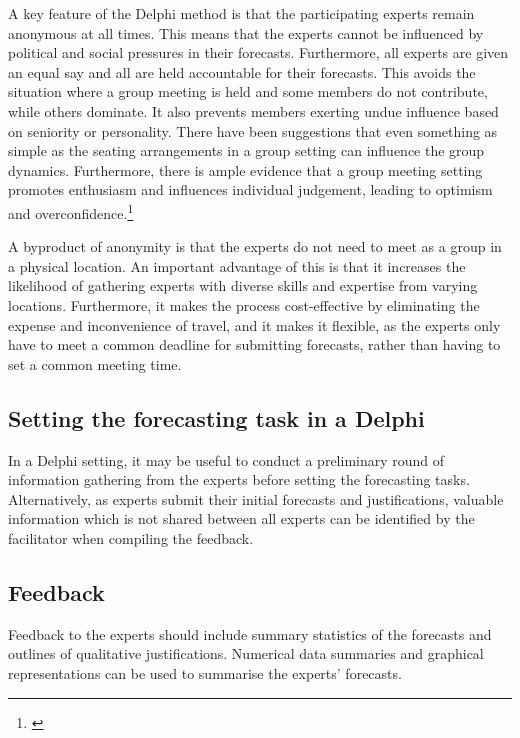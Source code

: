 \documentclass[]{book}
\let\rmarkdownfootnote\footnote%
\def\footnote{\protect\rmarkdownfootnote}
\begin{document}
A key feature of the Delphi method is that the participating experts remain anonymous at all times. This means that the experts cannot be influenced by political and social pressures in their forecasts. Furthermore, all experts are given an equal say and all are held accountable for their forecasts. This avoids the situation where a group meeting is held and some members do not contribute, while others dominate. It also prevents members exerting undue influence based on seniority or personality. There have been suggestions that even something as simple as the seating arrangements in a group setting can influence the group dynamics. Furthermore, there is ample evidence that a group meeting setting promotes enthusiasm and influences individual judgement, leading to optimism and overconfidence.\footnote{\citet{Buehler2005}}

A byproduct of anonymity is that the experts do not need to meet as a group in a physical location. An important advantage of this is that it increases the likelihood of gathering experts with diverse skills and expertise from varying locations. Furthermore, it makes the process cost-effective by eliminating the expense and inconvenience of travel, and it makes it flexible, as the experts only have to meet a common deadline for submitting forecasts, rather than having to set a common meeting time.

\hypertarget{setting-the-forecasting-task-in-a-delphi}{%
\subsection*{Setting the forecasting task in a Delphi}\label{setting-the-forecasting-task-in-a-delphi}}

In a Delphi setting, it may be useful to conduct a preliminary round of information gathering from the experts before setting the forecasting tasks. Alternatively, as experts submit their initial forecasts and justifications, valuable information which is not shared between all experts can be identified by the facilitator when compiling the feedback.

\hypertarget{feedback}{%
\subsection*{Feedback}\label{feedback}}

Feedback to the experts should include summary statistics of the forecasts and outlines of qualitative justifications. Numerical data summaries and graphical representations can be used to summarise the experts' forecasts.
\end{document}
